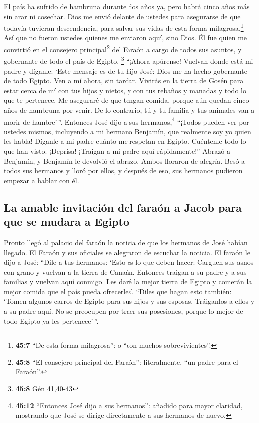 El país ha sufrido de hambruna durante dos años ya, pero
habrá cinco años más sin arar ni cosechar.  Dios me envió
delante de ustedes para asegurarse de que todavía tuvieran descendencia,
para salvar sus vidas de esta forma milagrosa.\footnote{\textbf{45:7}
  ``De esta forma milagrosa'': o ``con muchos sobrevivientes''.}
 Así que no fueron ustedes quienes me enviaron aquí, sino
Dios. Él fue quien me convirtió en el consejero principal\footnote{\textbf{45:8}
  ``El consejero principal del Faraón'': literalmente, ``un padre para
  el Faraón''.} del Faraón a cargo de todos sus asuntos, y gobernante de
todo el país de Egipto. \footnote{\textbf{45:8} Gén 41,40-43}
 ``¡Ahora apúrense! Vuelvan donde está mi padre y díganle:
`Este mensaje es de tu hijo José: Dios me ha hecho gobernante de todo
Egipto. Ven a mí ahora, sin tardar.  Vivirás en la tierra
de Gosén para estar cerca de mí con tus hijos y nietos, y con tus
rebaños y manadas y todo lo que te pertenece.  Me
aseguraré de que tengan comida, porque aún quedan cinco años de hambruna
por venir. De lo contrario, tú y tu familia y tus animales van a morir
de hambre'\,''.  Entonces José dijo a sus
hermanos,\footnote{\textbf{45:12} ``Entonces José dijo a sus hermanos'':
  añadido para mayor claridad, mostrando que José se dirige directamente
  a sus hermanos de nuevo.} ``¡Todos pueden ver por ustedes mismos,
incluyendo a mi hermano Benjamín, que realmente soy yo quien les habla!
 Díganle a mi padre cuánto me respetan en Egipto.
Cuéntenle todo lo que han visto. ¡Deprisa! ¡Traigan a mi padre aquí
rápidamente!''  Abrazó a Benjamín, y Benjamín le devolvió
el abrazo. Ambos lloraron de alegría.  Besó a todos sus
hermanos y lloró por ellos, y después de eso, sus hermanos pudieron
empezar a hablar con él.

\hypertarget{la-amable-invitaciuxf3n-del-farauxf3n-a-jacob-para-que-se-mudara-a-egipto}{%
\subsection{La amable invitación del faraón a Jacob para que se mudara a
Egipto}\label{la-amable-invitaciuxf3n-del-farauxf3n-a-jacob-para-que-se-mudara-a-egipto}}

 Pronto llegó al palacio del faraón la noticia de que los
hermanos de José habían llegado. El Faraón y sus oficiales se alegraron
de escuchar la noticia.  El faraón le dijo a José: ``Dile
a tus hermanos: `Esto es lo que deben hacer: Carguen sus asnos con grano
y vuelvan a la tierra de Canaán.  Entonces traigan a su
padre y a sus familias y vuelvan aquí conmigo. Les daré la mejor tierra
de Egipto y comerán la mejor comida que el país pueda ofrecerles'.
 ``Diles que hagan esto también: `Tomen algunos carros de
Egipto para sus hijos y sus esposas. Tráiganlos a ellos y a su padre
aquí.  No se preocupen por traer sus posesiones, porque
lo mejor de todo Egipto ya les pertenece'\,''.

